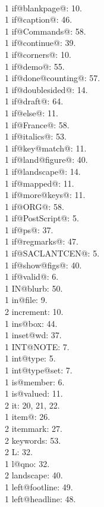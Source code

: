 \\1 if@blankpage@: 10.
\\1 if@caption@: 46.
\\1 if@Commands@: 58.
\\1 if@continue@: 39.
\\1 if@corners@: 10.
\\1 if@demo@: 55.
\\1 if@done@counting@: 57.
\\1 if@doublesided@: 14.
\\1 if@draft@: 64.
\\1 if@else@: 11.
\\1 if@France@: 58.
\\1 if@italics@: 53.
\\1 if@key@match@: 11.
\\1 if@land@figure@: 40.
\\1 if@landscape@: 14.
\\1 if@mapped@: 11.
\\1 if@more@keys@: 11.
\\1 if@ORG@: 58.
\\1 if@PostScript@: 5.
\\1 if@ps@: 37.
\\1 if@regmarks@: 47.
\\1 if@SACLANTCEN@: 5.
\\1 if@show@figs@: 40.
\\1 if@valid@: 6.
\\1 IN@blurb: 50.
\\1 in@file: 9.
\\2 increment: 10.
\\1 ins@box: 44.
\\1 inset@wd: 37.
\\1 INT@NOTE: 7.
\\1 int@type: 5.
\\1 int@type@set: 7.
\\1 is@member: 6.
\\1 is@valued: 11.
\\2 it: 20, 21, 22.
\\1 item@: 26.
\\2 itemmark: 27.
\\2 keywords: 53.
\\2 L: 32.
\\1 l@qno: 32.
\\2 landscape: 40.
\\1 left@footline: 49.
\\1 left@headline: 48.
